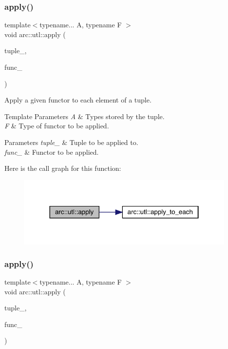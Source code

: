 \subsubsection{\texorpdfstring{apply()}{apply()}\hspace{0.1cm}{\footnotesize\ttfamily [5/6]}}
{\footnotesize\ttfamily template$<$typename... A, typename F $>$ \\
void arc\+::utl\+::apply (\begin{DoxyParamCaption}\item[{std\+::tuple$<$ A... $>$ \&}]{tuple\+\_\+,  }\item[{F}]{func\+\_\+ }\end{DoxyParamCaption})}

Apply a given functor to each element of a tuple.


\begin{DoxyTemplParams}{Template Parameters}
{\em A} & Types stored by the tuple. \\
\hline
{\em F} & Type of functor to be applied.\\
\hline
\end{DoxyTemplParams}

\begin{DoxyParams}{Parameters}
{\em tuple\+\_\+} & Tuple to be applied to. \\
\hline
{\em func\+\_\+} & Functor to be applied. \\
\hline
\end{DoxyParams}
Here is the call graph for this function\+:\nopagebreak
\begin{figure}[H]
\begin{center}
\leavevmode
\includegraphics[width=308pt]{namespacearc_1_1utl_af64bed0e9e6ac7220d393a1bb62f4bff_cgraph}
\end{center}
\end{figure}
\mbox{\label{namespacearc_1_1utl_a6dadc719c6540032592f36b5c14cae27}} 
\subsubsection{\texorpdfstring{apply()}{apply()}\hspace{0.1cm}{\footnotesize\ttfamily [6/6]}}
{\footnotesize\ttfamily template$<$typename... A, typename F $>$ \\
void arc\+::utl\+::apply (\begin{DoxyParamCaption}\item[{const std\+::tuple$<$ A... $>$ \&}]{tuple\+\_\+,  }\item[{F}]{func\+\_\+ }\end{DoxyParamCaption})}


